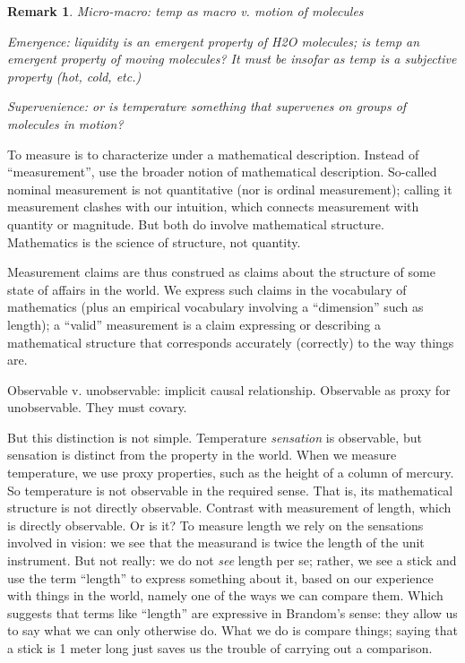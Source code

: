 \documentclass[11pt,twoside]{article}
\newtheorem{remark}{Remark}
\begin{document}
\begin{remark}

Micro-macro:  temp as macro v. motion of molecules

Emergence: liquidity is an emergent property of H2O molecules; is temp
an emergent property of moving molecules?  It must be insofar as temp
is a subjective property (hot, cold, etc.)

Supervenience: or is temperature something that supervenes on groups
of molecules in motion?

\end{remark}

To measure is to characterize under a mathematical description.
Instead of ``measurement'', use the broader notion of mathematical
description.  So-called nominal measurement is not quantitative (nor
is ordinal measurement); calling it measurement clashes with our
intuition, which connects measurement with quantity or magnitude.  But
both do involve mathematical structure.  Mathematics is the science of
structure, not quantity.

Measurement claims are thus construed as claims about the structure of
some state of affairs in the world.  We express such claims in the
vocabulary of mathematics (plus an empirical vocabulary involving a
``dimension'' such as length); a ``valid'' measurement is a claim
expressing or describing a mathematical structure that corresponds
accurately (correctly) to the way things are.

Observable v. unobservable: implicit causal relationship.  Observable
as proxy for unobservable.  They must covary.

But this distinction is not simple.  Temperature \textit{sensation} is
observable, but sensation is distinct from the property in the world.
When we measure temperature, we use proxy properties, such as the
height of a column of mercury.  So temperature is not observable in
the required sense.  That is, its mathematical structure is not
directly observable.  Contrast with measurement of length, which is
directly observable.  Or is it?  To measure length we rely on the
sensations involved in vision: we see that the measurand is twice the
length of the unit instrument.  But not really: we do not \textit{see}
length per se; rather, we see a stick and use the term ``length'' to
express something about it, based on our experience with things in the
world, namely one of the ways we can compare them.  Which suggests
that terms like ``length'' are expressive in Brandom's sense: they
allow us to say what we can only otherwise do.  What we do is compare
things; saying that a stick is 1 meter long just saves us the trouble
of carrying out a comparison.
\end{document}
